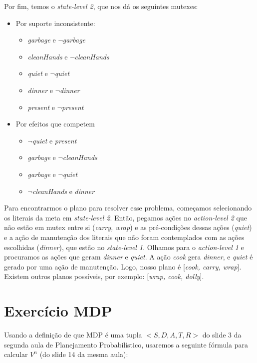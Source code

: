 \documentclass[12pt,letterpaper]{article}
\begin{document}
	Por fim, temos o \textit{state-level 2}, que nos dá os seguintes mutexes:

	\begin{itemize}
		\item Por suporte inconsistente:
		\begin{itemize}
			\item \textit{garbage} e \textit{$\lnot$garbage}
			\item \textit{cleanHands} e \textit{$\lnot$cleanHands}
			\item \textit{quiet} e \textit{$\lnot$quiet}
			\item \textit{dinner} e \textit{$\lnot$dinner}
			\item \textit{present} e \textit{$\lnot$present}
		\end{itemize}
		\item Por efeitos que competem
		 \begin{itemize}
			\item \textit{$\lnot$quiet} e \textit{present}
			\item \textit{garbage} e \textit{$\lnot$cleanHands}
			\item \textit{garbage} e \textit{$\lnot$quiet}
			\item \textit{$\lnot$cleanHands} e \textit{dinner}
		\end{itemize}
	\end{itemize}


	Para encontrarmos o plano para resolver esse problema, começamos selecionando os literais da meta em \textit{state-level 2}. Então, pegamos ações no \textit{action-level 2} que não estão em mutex entre si (\textit{carry, wrap}) e as pré-condições dessas ações (\textit{quiet}) e a ação de manutenção dos literais que não foram contemplados com as ações escolhidas (\textit{dinner}), que estão no \textit{state-level 1}. Olhamos para o \textit{action-level 1} e procuramos as ações que geram \textit{dinner} e \textit{quiet}. A ação \textit{cook} gera \textit{dinner}, e \textit{quiet} é gerado por uma ação de manutenção. Logo, nosso plano é [\textit{cook, carry, wrap}]. Existem outros planos possíveis, por exemplo: [\textit{wrap, cook, dolly}].    

	\section*{Exercício MDP}
	
	Usando a definição de que MDP é uma tupla $<S, D, A, T, R>$ do slide 3 da segunda aula de Planejamento Probabilístico, usaremos a seguinte fórmula para calcular $V^n$ (do slide 14 da mesma aula):
	
\end{document}
